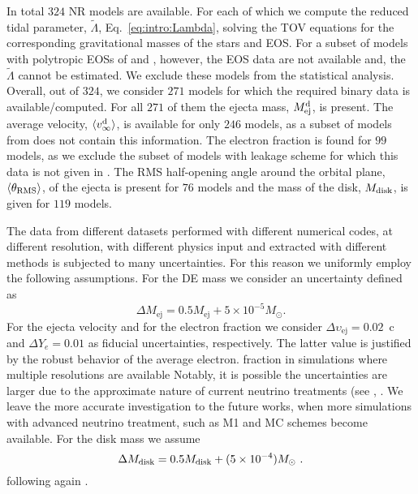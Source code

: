 In total $324$ \ac{NR} models are available.
For each of which we compute the reduced tidal parameter, $\tilde{\Lambda}$, 
Eq.~\eqref{eq:intro:Lambda}, solving the \ac{TOV} equations for the corresponding 
gravitational masses of the stars and \ac{EOS}.
% 
For a subset of models with polytropic \acp{EOS} of \citet{Bauswein:2013jpa}
and \citet{Kiuchi:2019lls}, however, the \ac{EOS} data are not available and, 
the $\tilde{\Lambda}$ cannot be estimated. We exclude these models from the 
statistical analysis. Overall, out of $324$, we consider $271$ models for which 
the required binary data is available/computed. For all $271$ of them the ejecta 
mass, $M^{\text{d}}_{\text{ej}}$, is present. The average velocity, $\langle v^{\text{d}}_\infty\rangle$, is available for only $246$ 
models, as a subset of models from \citet{Kiuchi:2019lls} does not contain this 
information. The electron fraction is found for $99$ models, as we exclude the 
subset of models with leakage scheme for which this data is not given in 
\citet{Lehner:2016lxy}. The \ac{RMS} half-opening angle around the orbital plane, 
$\langle\theta_{\rm RMS}\rangle$, of the ejecta is present for $76$ models and the mass of the disk, 
$M_{\rm disk}$, is given for $119$ models.

The data from different datasets performed with different numerical codes, at 
different resolution, with different physics input and extracted with different 
methods is subjected to many uncertainties. 
For this reason we uniformly employ the following assumptions.
%
For the \ac{DE} mass we consider an uncertainty defined as  \citep{Radice:2018pdn}
%
\begin{equation}
\Delta M_{\text{ej}} = 0.5M_{\text{ej}} + 5\times10^{-5}M_{\odot}.
\label{eq:ejecta:mej_err}
\end{equation}
%
For the ejecta velocity and for the electron fraction we consider 
$\Delta \upsilon_{\text{ej}} = 0.02$~c 
and $ \Delta Y_e = 0.01$ as fiducial uncertainties, respectively.
The latter value is justified by the robust behavior of the average electron. 
fraction in simulations where multiple resolutions are available
Notably, it is possible the uncertainties are larger due to the approximate nature of current 
neutrino treatments (see \eg, \citet{Foucart:2016rxm,Foucart:2018gis}. 
We leave the more accurate investigation to the future works, when more simulations
with advanced neutrino treatment, such as M1 and \ac{MC} schemes become available. 
%
For the disk mass we assume 
\begin{equation}
\Delta M_{\text{disk}} = 0.5M_{\rm disk} + (5\times
10^{-4})M_{\odot}\ .
\label{eq:disk:mdisk_err}
\end{equation}
following again \citep{Radice:2018pdn}.

